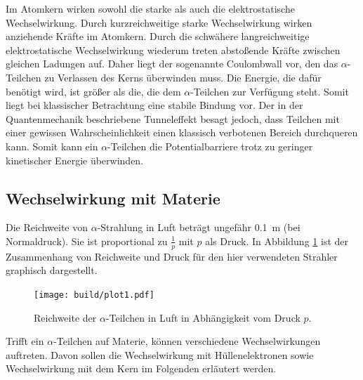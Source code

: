Im Atomkern wirken sowohl die starke als auch die elektrostatische Wechselwirkung. Durch kurzreichweitige starke Wechselwirkung wirken anziehende Kräfte im Atomkern. Durch die schwähere langreichweitige elektrostatische Wechselwirkung wiederum treten abstoßende Kräfte zwischen gleichen Ladungen auf. Daher liegt der sogenannte Coulombwall vor, den das $\alpha$-Teilchen zu Verlassen des Kerns überwinden muss. Die Energie, die dafür benötigt wird, ist größer als die, die dem $\alpha$-Teilchen zur Verfügung steht. Somit liegt bei klassischer Betrachtung eine stabile Bindung vor. Der in der Quantenmechanik beschriebene Tunneleffekt besagt jedoch, dass Teilchen mit einer gewissen Wahrscheinlichkeit einen klassisch verbotenen Bereich durchqueren kann. Somit kann ein $\alpha$-Teilchen die Potentialbarriere trotz zu geringer kinetischer Energie überwinden.

\subsection{Wechselwirkung mit Materie}
Die Reichweite von $\alpha$-Strahlung in Luft beträgt ungefähr \SI{0.1}{\meter} (bei Normaldruck). Sie ist proportional zu $\frac{1}{p}$ mit $p$ als Druck. In Abbildung \ref{fig:luft} ist der Zusammenhang von Reichweite und Druck für den hier verwendeten Strahler graphisch dargestellt.

\begin{figure}
	\centering
  \texttt{[image: build/plot1.pdf]}
	\caption{Reichweite der $\alpha$-Teilchen in Luft in Abhängigkeit vom Druck $p$.}
	\label{fig:luft}
\end{figure}

Trifft ein $\alpha$-Teilchen auf Materie, können verschiedene Wechselwirkungen auftreten. Davon sollen die Wechselwirkung mit Hüllenelektronen sowie Wechselwirkung mit dem Kern im Folgenden erläutert werden.
